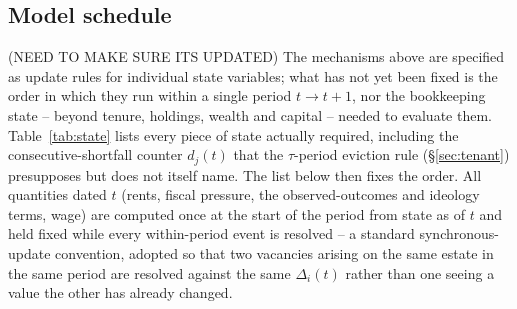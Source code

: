 \documentclass[11pt,english]{article}
\begin{document}
\subsection{Model schedule}
\label{sec:schedule}
(NEED TO MAKE SURE ITS UPDATED)
The mechanisms above are specified as update rules for individual state variables; what has not yet been fixed is the order in which they run within a single period $t\to t+1$, nor the bookkeeping state -- beyond tenure, holdings, wealth and capital -- needed to evaluate them. Table~\ref{tab:state} lists every piece of state actually required, including the consecutive-shortfall counter $d_j(t)$ that the $\tau$-period eviction rule (\S\ref{sec:tenant}) presupposes but does not itself name. The list below then fixes the order. All quantities dated $t$ (rents, fiscal pressure, the observed-outcomes and ideology terms, wage) are computed once at the start of the period from state as of $t$ and held fixed while every within-period event is resolved -- a standard synchronous-update convention, adopted so that two vacancies arising on the same estate in the same period are resolved against the same $\Delta_i(t)$ rather than one seeing a value the other has already changed.
\end{document}
